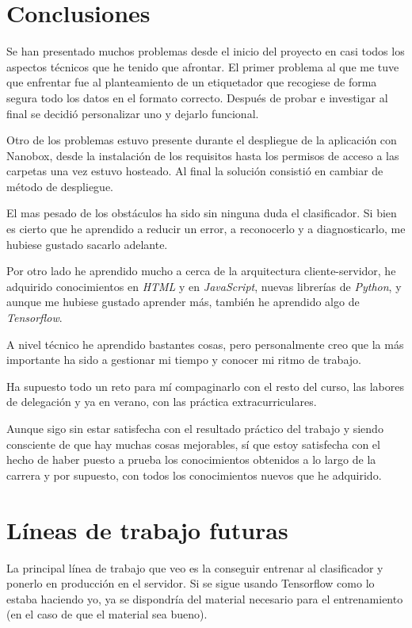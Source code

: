 
\section{Conclusiones}
Se han presentado muchos problemas desde el inicio del proyecto en casi todos los aspectos técnicos que he tenido que afrontar.
El primer problema al que me tuve que enfrentar fue al planteamiento de un etiquetador que recogiese de forma segura todo los datos en el formato correcto. Después de probar e investigar al final se decidió personalizar uno y dejarlo funcional.

Otro de los problemas estuvo presente durante el despliegue de la aplicación con Nanobox, desde la instalación de los requisitos hasta los permisos de acceso a las carpetas una vez estuvo hosteado. Al final la solución consistió en cambiar de método de despliegue.

El mas pesado de los obstáculos ha sido sin ninguna duda el clasificador. Si bien es cierto que he aprendido a reducir un error, a reconocerlo y a diagnosticarlo, me hubiese gustado sacarlo adelante.

Por otro lado he aprendido mucho a cerca de la arquitectura cliente-servidor, he adquirido conocimientos en \textit{HTML} y en \textit{JavaScript}, nuevas librerías de \textit{Python}, y aunque me hubiese gustado aprender más, también he aprendido algo de \textit{Tensorflow}.

A nivel técnico he aprendido bastantes cosas, pero personalmente creo que la más importante ha sido a gestionar mi tiempo y conocer mi ritmo de trabajo.

Ha supuesto todo un reto para mí compaginarlo con el resto del curso, las labores de delegación y ya en verano, con las práctica extracurriculares. 

Aunque sigo sin estar satisfecha con el resultado práctico del trabajo y siendo consciente de que hay muchas cosas mejorables, sí que estoy satisfecha con el hecho de haber puesto a prueba los conocimientos obtenidos a lo largo de la carrera y por supuesto, con todos los conocimientos nuevos que he adquirido.


\section{Líneas de trabajo futuras}

La principal línea de trabajo que veo es la conseguir entrenar al clasificador y ponerlo en producción en el servidor.
Si se sigue usando Tensorflow como lo estaba haciendo yo, ya se dispondría del material necesario para el entrenamiento (en el caso de que el material sea bueno).

